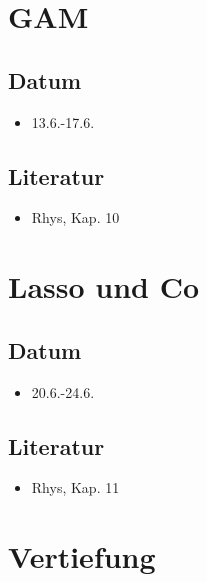 \documentclass[
]{book}
\providecommand{\tightlist}{%
  \setlength{\itemsep}{0pt}\setlength{\parskip}{0pt}}
\begin{document}
\hypertarget{gam}{%
\section{GAM}\label{gam}}

\hypertarget{datum-12}{%
\subsection{Datum}\label{datum-12}}

\begin{itemize}
\tightlist
\item
  13.6.-17.6.
\end{itemize}

\hypertarget{literatur-11}{%
\subsection{Literatur}\label{literatur-11}}

\begin{itemize}
\tightlist
\item
  Rhys, Kap. 10
\end{itemize}

\hypertarget{lasso-und-co}{%
\section{Lasso und Co}\label{lasso-und-co}}

\hypertarget{datum-13}{%
\subsection{Datum}\label{datum-13}}

\begin{itemize}
\tightlist
\item
  20.6.-24.6.
\end{itemize}

\hypertarget{literatur-12}{%
\subsection{Literatur}\label{literatur-12}}

\begin{itemize}
\tightlist
\item
  Rhys, Kap. 11
\end{itemize}

\hypertarget{vertiefung-1}{%
\section{Vertiefung}\label{vertiefung-1}}
\end{document}
